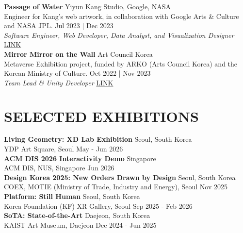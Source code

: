 \documentclass[a4paper,9pt]{extarticle}
\begin{document}
\noindent
\textbf{Passage of Water} \hfill Yiyun Kang Studio, Google, NASA\\ %
{Engineer for Kang's web artwork, in collaboration with Google Arts \& Culture and NASA JPL.} \hfill Jul 2023 | Dec 2023 \\
\textit{Software Engineer, Web Developer, Data Analyst, and Visualization Designer} \hfill \href{https://goo.gle/passageofwater}{LINK} \\

\noindent
\textbf{Mirror Mirror on the Wall} \hfill Art Council Korea\\ %
{Metaverse Exhibition project, funded by ARKO (Arts Council Korea) and the Korean Ministry of Culture.} \hfill Oct 2022 | Nov 2023 \\
\textit{Team Lead \& Unity Developer}  \hfill \href{https://monaverse.com/spaces/mirror-mirror-on-the-wall-7c21}{LINK} \\

%


\section*{SELECTED EXHIBITIONS}

\noindent
\textbf{Living Geometry: XD Lab Exhibition} \hfill Seoul, South Korea\\ %
{YDP Art Square, Seoul} \hfill May - Jun 2026 \\

\noindent
\textbf{ACM DIS 2026 Interactivity Demo} \hfill Singapore\\ %
{ACM DIS, NUS, Singapore} \hfill Jun 2026 \\


\noindent
\textbf{Design Korea 2025: New Orders Drawn by Design} \hfill Seoul, South Korea\\ %
{COEX, MOTIE (Ministry of Trade, Industry and Energy), Seoul} \hfill Nov 2025 \\

\noindent
\textbf{Platform: Still Human} \hfill Seoul, South Korea\\ %
{Korea Foundation (KF) XR Gallery, Seoul} \hfill Sep 2025 - Feb 2026 \\

\noindent
\textbf{SoTA: State-of-the-Art} \hfill Daejeon, South Korea\\ %
{KAIST Art Museum, Daejeon} \hfill Dec 2024 - Jun 2025 \\
\end{document}
